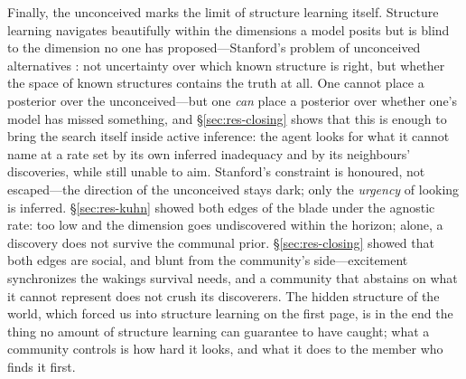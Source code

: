 \documentclass[11pt]{article}
\begin{document}
Finally, the unconceived marks the limit of structure learning itself. Structure learning navigates
beautifully within the dimensions a model posits but is blind to the dimension no one has
proposed---Stanford's problem of unconceived alternatives \citep{stanford2006}: not uncertainty over
which known structure is right, but whether the space of known structures contains the truth at all.
One cannot place a posterior over the unconceived---but one \emph{can} place a posterior over
whether one's model has missed something, and \S\ref{sec:res-closing} shows that this is enough to
bring the search itself inside active inference: the agent looks for what it cannot name at a rate
set by its own inferred inadequacy and by its neighbours' discoveries, while still unable to aim.
Stanford's constraint is honoured, not escaped---the direction of the unconceived stays dark; only
the \emph{urgency} of looking is inferred. \S\ref{sec:res-kuhn} showed both edges of the blade
under the agnostic rate: too low and the dimension goes undiscovered within the horizon; alone, a
discovery does not survive the communal prior. \S\ref{sec:res-closing} showed that both edges are
social, and blunt from the community's side---excitement synchronizes the wakings survival needs,
and a community that abstains on what it cannot represent does not crush its discoverers. The
hidden structure of the world, which forced us into structure learning on the first page, is in
the end the thing no amount of structure learning can guarantee to have caught; what a community
controls is how hard it looks, and what it does to the member who finds it first.
\end{document}
